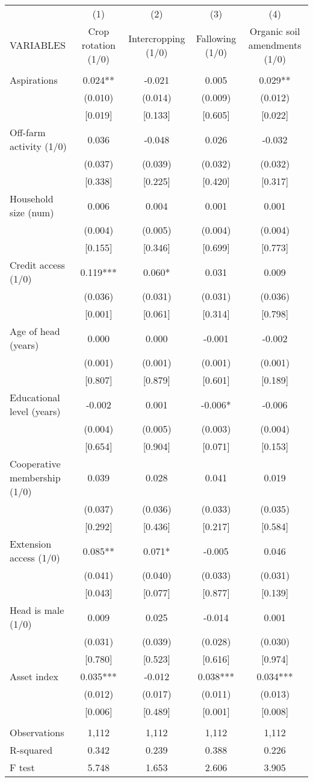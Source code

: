 \documentclass[]{article}
\begin{document}
\begin{tabular}{lcccc} \hline
 & (1) & (2) & (3) & (4) \\
VARIABLES & Crop rotation (1/0) & Intercropping (1/0) & Fallowing (1/0) & Organic soil amendments (1/0) \\ \hline
 &  &  &  &  \\
Aspirations & 0.024** & -0.021 & 0.005 & 0.029** \\
 & (0.010) & (0.014) & (0.009) & (0.012) \\
 & [0.019] & [0.133] & [0.605] & [0.022] \\
Off-farm activity (1/0) & 0.036 & -0.048 & 0.026 & -0.032 \\
 & (0.037) & (0.039) & (0.032) & (0.032) \\
 & [0.338] & [0.225] & [0.420] & [0.317] \\
Household size (num) & 0.006 & 0.004 & 0.001 & 0.001 \\
 & (0.004) & (0.005) & (0.004) & (0.004) \\
 & [0.155] & [0.346] & [0.699] & [0.773] \\
Credit access (1/0) & 0.119*** & 0.060* & 0.031 & 0.009 \\
 & (0.036) & (0.031) & (0.031) & (0.036) \\
 & [0.001] & [0.061] & [0.314] & [0.798] \\
Age of head (years) & 0.000 & 0.000 & -0.001 & -0.002 \\
 & (0.001) & (0.001) & (0.001) & (0.001) \\
 & [0.807] & [0.879] & [0.601] & [0.189] \\
Educational level (years) & -0.002 & 0.001 & -0.006* & -0.006 \\
 & (0.004) & (0.005) & (0.003) & (0.004) \\
 & [0.654] & [0.904] & [0.071] & [0.153] \\
Cooperative membership (1/0) & 0.039 & 0.028 & 0.041 & 0.019 \\
 & (0.037) & (0.036) & (0.033) & (0.035) \\
 & [0.292] & [0.436] & [0.217] & [0.584] \\
Extension access (1/0) & 0.085** & 0.071* & -0.005 & 0.046 \\
 & (0.041) & (0.040) & (0.033) & (0.031) \\
 & [0.043] & [0.077] & [0.877] & [0.139] \\
Head is male (1/0) & 0.009 & 0.025 & -0.014 & 0.001 \\
 & (0.031) & (0.039) & (0.028) & (0.030) \\
 & [0.780] & [0.523] & [0.616] & [0.974] \\
Asset index & 0.035*** & -0.012 & 0.038*** & 0.034*** \\
 & (0.012) & (0.017) & (0.011) & (0.013) \\
 & [0.006] & [0.489] & [0.001] & [0.008] \\
 &  &  &  &  \\
Observations & 1,112 & 1,112 & 1,112 & 1,112 \\
R-squared & 0.342 & 0.239 & 0.388 & 0.226 \\
 F test & 5.748 & 1.653 & 2.606 & 3.905 \\ \hline
\end{tabular}
\end{document}
